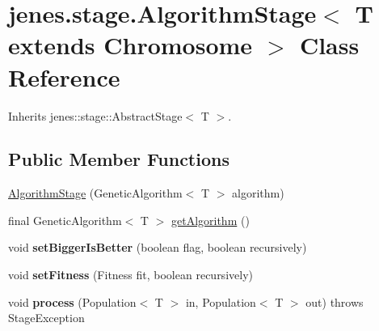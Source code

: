 \hypertarget{classjenes_1_1stage_1_1_algorithm_stage_3_01_t_01extends_01_chromosome_01_4}{
\section{jenes.stage.AlgorithmStage$<$ T extends Chromosome $>$ Class Reference}
\label{classjenes_1_1stage_1_1_algorithm_stage_3_01_t_01extends_01_chromosome_01_4}
}
Inherits jenes::stage::AbstractStage$<$ T $>$.

\subsection*{Public Member Functions}
\begin{CompactItemize}
\item 
\hyperlink{classjenes_1_1stage_1_1_algorithm_stage_3_01_t_01extends_01_chromosome_01_4_802871d36189757fc869c5a542dc1b9c}{AlgorithmStage} (GeneticAlgorithm$<$ T $>$ algorithm)
\item 
final GeneticAlgorithm$<$ T $>$ \hyperlink{classjenes_1_1stage_1_1_algorithm_stage_3_01_t_01extends_01_chromosome_01_4_7c1be30eb9852c0f16031f3802d770aa}{getAlgorithm} ()
\item 
\hypertarget{classjenes_1_1stage_1_1_algorithm_stage_3_01_t_01extends_01_chromosome_01_4_5d27c95b7872fc28cc7b78be601dd9d0}{
void \textbf{setBiggerIsBetter} (boolean flag, boolean recursively)}
\label{classjenes_1_1stage_1_1_algorithm_stage_3_01_t_01extends_01_chromosome_01_4_5d27c95b7872fc28cc7b78be601dd9d0}

\item 
\hypertarget{classjenes_1_1stage_1_1_algorithm_stage_3_01_t_01extends_01_chromosome_01_4_43c9964c60c539aaea0193c9552b262b}{
void \textbf{setFitness} (Fitness fit, boolean recursively)}
\label{classjenes_1_1stage_1_1_algorithm_stage_3_01_t_01extends_01_chromosome_01_4_43c9964c60c539aaea0193c9552b262b}

\item 
\hypertarget{classjenes_1_1stage_1_1_algorithm_stage_3_01_t_01extends_01_chromosome_01_4_43a7b7271f320f04c8be69bfdafb078e}{
void \textbf{process} (Population$<$ T $>$ in, Population$<$ T $>$ out)  throws StageException }
\label{classjenes_1_1stage_1_1_algorithm_stage_3_01_t_01extends_01_chromosome_01_4_43a7b7271f320f04c8be69bfdafb078e}

\end{CompactItemize}


